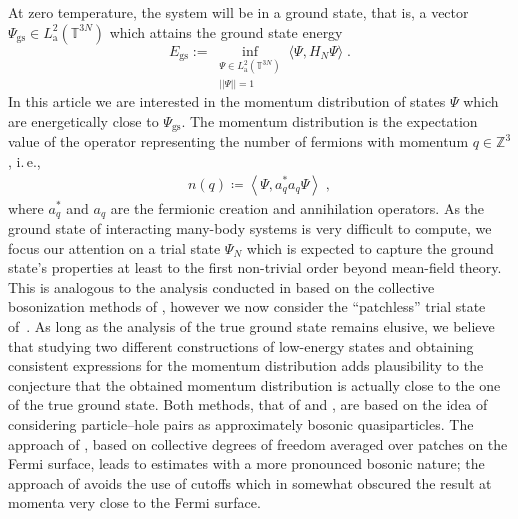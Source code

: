 \documentclass[12pt,a4paper]{article}
\numberwithin{equation}{section}
\newcommand{\Zbb}{\mathbb{Z}}
\newcommand{\1}{\mathbb{I}}
\newcommand{\GS}{\mathrm{gs}}
\newcommand{\T}{\mathbb{T}}
\newcommand{\eva}[1]{\left\langle #1 \right\rangle}
\theoremstyle{plain}
\theoremstyle{definition}
\theoremstyle{remark}
\theoremstyle{plain}
\theoremstyle{definition}
\theoremstyle{remark}
\begin{document}
At zero temperature, the system will be in a ground state, that is, a vector $ \Psi_{\GS} \in L^2_{\mathrm{a}}(\T^{3N}) $ which attains the ground state energy
\begin{equation} \label{eq:EGS}
	E_{\GS}
	:= \inf_{\substack{\Psi \in L^2_{\mathrm{a}}(\T^{3N}) \\||\Psi|| = 1}} \langle \Psi, H_N \Psi \rangle \;.
\end{equation}
In this article we are interested in the momentum distribution of states $ \Psi $ which are energetically close to $ \Psi_{\GS} $. The momentum distribution is the expectation value of the operator representing the number of fermions with momentum $q \in \Zbb^3$, i.\,e.,
\begin{align}
	n(q) \coloneq \eva{\Psi, a^*_q a_q \Psi} \;,
\end{align}
where $ a_q^*$ and $a_q $ are the fermionic creation and annihilation operators. As the ground state of interacting many-body systems is very difficult to compute, we focus our attention on a trial state $ \Psi_N $ which is expected to capture the ground state's properties at least to the first non-trivial order beyond mean-field theory. This is analogous to the analysis conducted in \cite{BL25} based on the collective bosonization methods of \cite{BNP+20,BNP+21}, however we now consider the ``patchless'' trial state of~\cite{CHN23}. As long as the analysis of the true ground state remains elusive, we believe that studying two different constructions of low-energy states and obtaining consistent expressions for the momentum distribution adds plausibility to the conjecture that the obtained momentum distribution is actually close to the one of the true ground state. Both methods, that of \cite{BL25} and \cite{CHN23}, are based on the idea of considering particle--hole pairs as approximately bosonic quasiparticles. The approach of \cite{BNP+20,BNP+21}, based on collective degrees of freedom averaged over patches on the Fermi surface, leads to estimates with a more pronounced bosonic nature; the approach of \cite{CHN23} avoids the use of cutoffs which in \cite{BL25} somewhat obscured the result at momenta very close to the Fermi surface.
\end{document}
